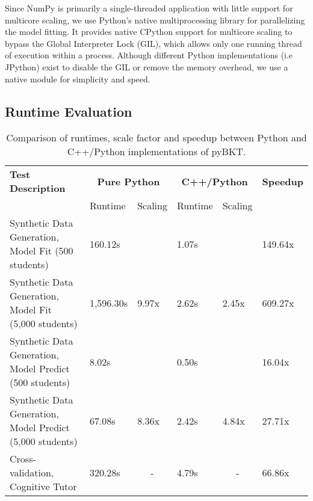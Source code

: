 \documentclass{edm_article}
\begin{document}
Since NumPy is primarily a single-threaded application with little support for multicore scaling, we use Python's native multiprocessing library for parallelizing the model fitting. It provides native CPython support for multicore scaling to bypass the Global Interpreter Lock (GIL), which allows only one running thread of execution within a process. Although different Python implementations (i.e JPython) exist to disable the GIL or remove the memory overhead, we use a native module for simplicity and speed. 

\subsection{Runtime Evaluation}

\begin{table*}[h]
\centering
\caption{Comparison of runtimes, scale factor and speedup between Python and C++/Python implementations of pyBKT.}
\begin{tabular}{|l|l|l|l|l|l|}
\hline
\textbf{Test Description}                                 & \multicolumn{2}{c|}{\textbf{Pure Python}} & \multicolumn{2}{c|}{\textbf{C++/Python}} & \textbf{Speedup} \\ \cline{2-5}
\textbf{}                                                 & Runtime       & Scaling                   & Runtime     & Scaling                    & \textbf{}        \\ \hline
Synthetic Data Generation, Model Fit (500 students)       & 160.12s      & \multicolumn{1}{c|}{}     & 1.07s       & \multicolumn{1}{c|}{}      & 149.64x          \\ \cline{1-2} \cline{4-4} \cline{6-6} 
Synthetic Data Generation, Model Fit (5,000 students)     & 1,596.30s     & 9.97x                     & 2.62s       & 2.45x                      & 609.27x          \\ \hline
Synthetic Data Generation, Model Predict (500 students)   & 8.02s         & \multicolumn{1}{c|}{}     & 0.50s       & \multicolumn{1}{c|}{}      & 16.04x           \\ \cline{1-2} \cline{4-4} \cline{6-6} 
Synthetic Data Generation, Model Predict (5,000 students) & 67.08s       & 8.36x                     & 2.42s       & 4.84x                      & 27.71x           \\ \hline
Cross-validation, Cognitive Tutor                         & 320.28s      & \multicolumn{1}{c|}{-}    & 4.79s       & \multicolumn{1}{c|}{-}     & 66.86x           \\ \hline
\end{tabular}
\end{table*}
\end{document}
